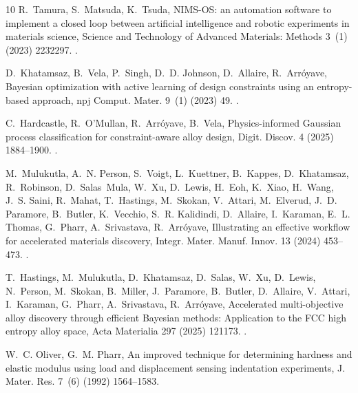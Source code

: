 \documentclass[preprint,12pt,times]{elsarticle}  %
\providecommand{\JournalTitle}[1]{#1}
\begin{document}
\begin{thebibliography}{10}
R.~Tamura, S.~Matsuda, K.~Tsuda, {NIMS-OS}: an automation software to implement
  a closed loop between artificial intelligence and robotic experiments in
  materials science, {\JournalTitle{Science and Technology of Advanced
  Materials: Methods}} 3~(1) (2023) 2232297.
\newblock \href {http://dx.doi.org/10.1080/27660400.2023.2232297}
  {}.

D.~Khatamsaz, B.~Vela, P.~Singh, D.~D. Johnson, D.~Allaire, R.~Arr{\'o}yave,
  Bayesian optimization with active learning of design constraints using an
  entropy-based approach, {\JournalTitle{npj Comput. Mater.}} 9~(1)
  (2023) 49.
\newblock \href {http://dx.doi.org/10.1038/s41524-023-01006-7}
  {}.

C.~Hardcastle, R.~O'Mullan, R.~Arr{\'o}yave, B.~Vela, Physics-informed
  {Gaussian} process classification for constraint-aware alloy design,
  {\JournalTitle{Digit. Discov.}} 4 (2025) 1884--1900.
\newblock \href {http://dx.doi.org/10.1039/D5DD00084J}
  {}.

M.~Mulukutla, A.~N. Person, S.~Voigt, L.~Kuettner, B.~Kappes, D.~Khatamsaz,
  R.~Robinson, D.~Salas~Mula, W.~Xu, D.~Lewis, H.~Eoh, K.~Xiao, H.~Wang, J.~S.
  Saini, R.~Mahat, T.~Hastings, M.~Skokan, V.~Attari, M.~Elverud, J.~D.
  Paramore, B.~Butler, K.~Vecchio, S.~R. Kalidindi, D.~Allaire, I.~Karaman,
  E.~L. Thomas, G.~Pharr, A.~Srivastava, R.~Arr{\'o}yave, Illustrating an
  effective workflow for accelerated materials discovery,
  {\JournalTitle{Integr. Mater. Manuf. Innov.}} 13 (2024)
  453--473.
\newblock \href {http://dx.doi.org/10.1007/s40192-024-00357-3}
  {}.

T.~Hastings, M.~Mulukutla, D.~Khatamsaz, D.~Salas, W.~Xu, D.~Lewis, N.~Person,
  M.~Skokan, B.~Miller, J.~Paramore, B.~Butler, D.~Allaire, V.~Attari,
  I.~Karaman, G.~Pharr, A.~Srivastava, R.~Arr{\'o}yave, Accelerated
  multi-objective alloy discovery through efficient {Bayesian} methods:
  Application to the {FCC} high entropy alloy space, {\JournalTitle{Acta
  Materialia}} 297 (2025) 121173.
\newblock \href {http://dx.doi.org/10.1016/j.actamat.2025.121173}
  {}.

W.~C. Oliver, G.~M. Pharr, An improved technique for determining hardness and
  elastic modulus using load and displacement sensing indentation experiments,
  {\JournalTitle{J. Mater. Res.}} 7~(6) (1992) 1564--1583.


\end{thebibliography}
\end{document}
